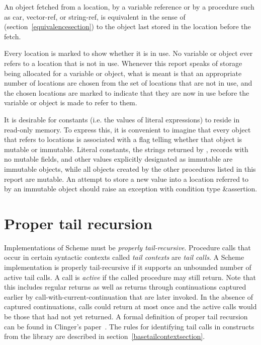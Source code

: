 An object fetched from a location, by a variable reference or by
a procedure such as {\cf car}, {\cf vector-ref}, or {\cf string-ref}, is
equivalent in the sense of  %
(section~\ref{equivalencesection})
to the object last stored in the location before the fetch.

Every location is marked to show whether it is in use.
No variable or object ever refers to a location that is not in use.
Whenever this report speaks of storage being allocated for a variable
or object, what is meant is that an appropriate number of locations are
chosen from the set of locations that are not in use, and the chosen
locations are marked to indicate that they are now in use before the variable
or object is made to refer to them.

It is desirable for constants (i.e. the values of
literal expressions) to reside in read-only memory.  To express this,
it is convenient to imagine that every object that refers to locations
is associated with a flag telling whether that object is
mutable or immutable.  Literal
constants, the strings returned by , records with
no mutable fields, and other values explicitly designated as immutable
are immutable objects, while all objects created by the other
procedures listed in this report are mutable.  An attempt to store a
new value into a location referred to by an immutable object
should raise an exception with condition type {\cf\&assertion}.


\section{Proper tail recursion}
\label{proper tail recursion}

Implementations of Scheme must be
{\em properly tail-recursive}.
Procedure calls that occur in certain syntactic
contexts called \textit{tail contexts}
are \textit{tail calls}.  A Scheme implementation is
properly tail-recursive if it supports an unbounded number of active
tail calls.  A call is {\em active} if the called procedure may still
return.  Note that this includes regular returns as well as returns
through continuations captured earlier by
{\cf call-with-current-continuation} that are later invoked.
In the absence of captured continuations, calls could
return at most once and the active calls would be those that had not
yet returned.
A formal definition of proper tail recursion can be found
in Clinger's paper~\cite{propertailrecursion}.  The rules for identifying tail calls
in constructs from the  library are described in
section~\ref{basetailcontextsection}.

